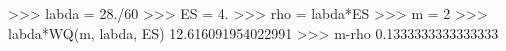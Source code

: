 
>>> labda = 28./60
>>> ES = 4.
>>> rho = labda*ES
>>> m = 2
>>> labda*WQ(m, labda, ES)
12.616091954022991
>>> m-rho
0.1333333333333333

